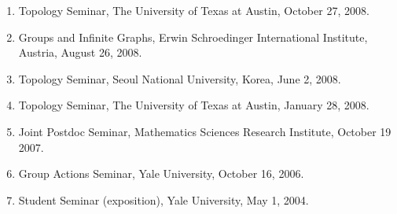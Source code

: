 \documentclass[11pt,a4paper]{article}
\begin{document}
\begin{enumerate}[leftmargin=1.5em, label=\arabic*.]
\item Topology Seminar, The University of Texas at Austin, October 27, 2008.
\item Groups and Infinite Graphs, Erwin Schroedinger International Institute, Austria, August 26, 2008.
\item Topology Seminar, Seoul National University, Korea, June 2, 2008.
\item Topology Seminar, The University of Texas at Austin, January 28, 2008.
\item Joint Postdoc Seminar, Mathematics Sciences Research Institute, October 19 2007.
\item Group Actions Seminar, Yale University, October 16, 2006.
\item Student Seminar (exposition), Yale University, May 1, 2004.
\end{enumerate}
\end{document}

